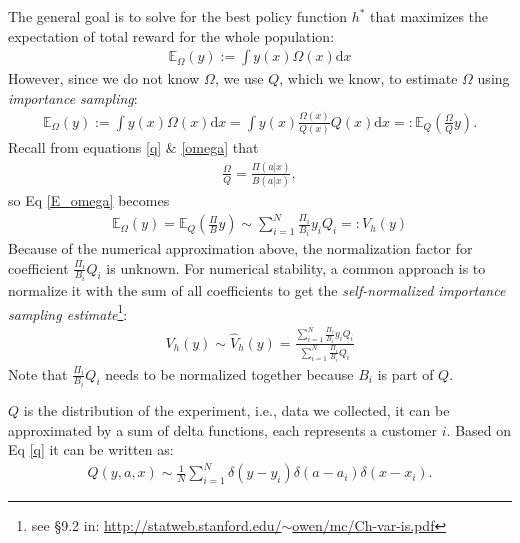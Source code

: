 \documentclass[11pt, oneside]{article}   	%
\begin{document}
The general goal is to solve for the best policy function $h^*$ that maximizes the expectation of total reward for the whole population:
\begin{align} %
    \mathbb{E}_{\Omega}(y) := \int y(x)  \Omega(x) \mathrm{d}x
\end{align}
However, since we do not know $\Omega$, we use $Q$, which we know, to estimate $\Omega$ using {\em importance sampling}: 
\begin{align} %
    \mathbb{E}_{\Omega}(y) :=   \int y(x)  \Omega(x) \mathrm{d}x = \int y(x) \frac{\Omega(x)}{Q(x)} Q(x) \mathrm{d}x =: \mathbb{E}_{Q}\left(\frac{\Omega}{Q}y \right) .
\label{E_omega}
\end{align}    
Recall from equations \ref{q} \& \ref{omega} that 
\begin{align}
   \frac{\Omega}{Q} = \frac{\Pi(a|x)}{B(a|x)}, 
\end{align}
so Eq \ref{E_omega} becomes
\begin{align}
\mathbb{E}_{\Omega}(y) = \mathbb{E}_{Q}\left(\frac{\Pi}{B}y \right) \sim \sum_{i=1}^{N} \frac{\Pi_i}{B_i} y_i  Q_i =: V_h(y)
\label{E_omega2}
\end{align}
Because of the numerical approximation above, the normalization factor for coefficient $\frac{\Pi_i}{B_i}Q_i$ is unknown. For numerical stability, a common approach is to normalize it with the sum of all coefficients to get the  {\em self-normalized importance sampling estimate}\footnote{see \S9.2 in: \href{http://statweb.stanford.edu/~owen/mc/Ch-var-is.pdf}{http://statweb.stanford.edu/$\sim$owen/mc/Ch-var-is.pdf}}:
\begin{align}
V_h(y) \sim \hat{V}_h(y) =  \frac{\sum_{i=1}^{N} \frac{\Pi_i}{B_i} y_i  Q_i }{\sum _{i=1}^{N} \frac{\Pi_i}{B_i} Q_i}
\label{V}
\end{align}
Note that $\frac{\Pi_i}{B_i} Q_i$ needs to be normalized together because $B_i$ is part of $Q$.

$Q$ is the distribution of the experiment, i.e., data we collected, it can be approximated by a sum of delta functions, each represents a customer $i$. Based on Eq \ref{q} it can be written as:
\begin{align}
	Q(y, a, x) \sim \frac{1}{N} \sum_{i=1}^{N} \delta(y-y_i) \delta(a-a_i) \delta(x-x_i).
\end{align}
\end{document}
